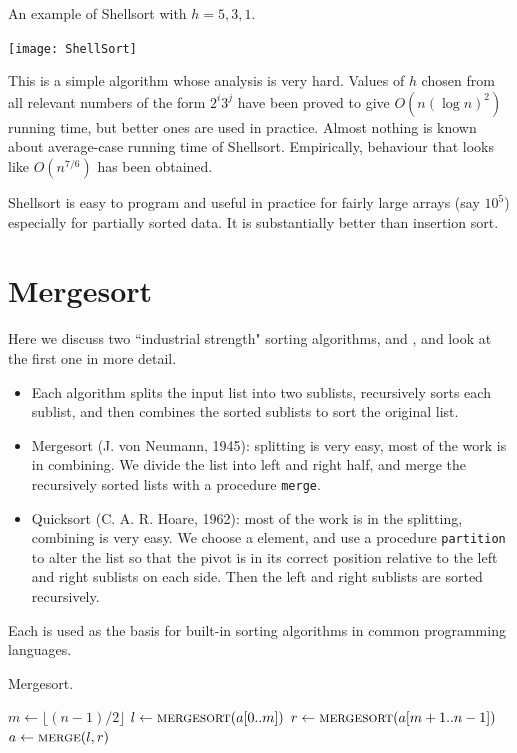 \begin{Boxample}
An example of Shellsort with $h = 5, 3, 1$.
\begin{center}
  \texttt{[image: ShellSort]} 
\end{center}
\end{Boxample}

This is a simple algorithm whose analysis is very hard. 
Values of $h$ chosen from all relevant numbers of the form $2^i 3^j$ have been proved to give 
$O(n (\log n)^2)$ running time, but better ones are used in practice. 
Almost nothing is known about average-case running time of Shellsort. 
Empirically, behaviour that looks like $O(n^{7/6})$ has been obtained. 

Shellsort is easy to program and useful in practice for fairly large arrays (say $10^5$) especially for partially sorted data. 
It is substantially  better than insertion sort.


\chapter{Mergesort}  %
\label{sec:mergesort}
Here we discuss two ``industrial strength" sorting algorithms,
 and , and look at the first one
in more detail. 
\begin{itemize}
\item Each algorithm splits the input list into two sublists, 
recursively sorts each sublist, and then combines the sorted sublists to sort 
the original list.
\item Mergesort (J. von Neumann, 1945): splitting is very easy, most 
of the work is in combining. 
We divide the list into left and right half, and merge the recursively sorted 
lists with a procedure \texttt{merge}. 
\item Quicksort (C. A. R. Hoare, 1962): most of the work is in the 
splitting, combining is very easy. We choose a  element, and use a 
procedure \texttt{partition} to alter the list so that the pivot is in its 
correct position relative to the left and right sublists on each side.
Then the left and right sublists are sorted recursively.
\end{itemize}
Each is used as the basis for 
built-in sorting algorithms in common programming languages.

\begin{algorithm}[H]
  \caption{Mergesort.}
    \label{alg:mergesort}
\begin{algorithmic}[0]
\State $m \gets \lfloor (n-1)/2 \rfloor$ 
\State $l \gets \Call{mergesort}{a[0..m]}$ 
\State $r \gets  \Call{mergesort}{a[m+1..n-1]}$ 
\State $a \gets  \Call{merge}{l, r}$ 
\EndIf
\State {}
\EndFunction  
\end{algorithmic}
\end{algorithm}

